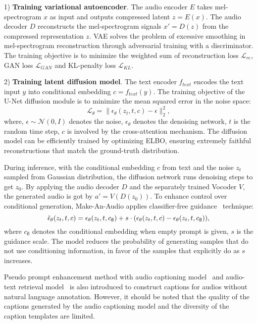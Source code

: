 \documentclass{article}
\begin{document}
1) \textbf{Training variational autoencoder}. The audio encoder $E$ takes mel-spectrogram $x$ as input and outputs compressed latent $z=E(x)$. The audio decoder $D$ reconstructs the mel-spectrogram signals $x'=D(z)$ from the compressed representation $z$. VAE solves the problem of excessive smoothing in mel-spectrogram reconstruction through adversarial training with a discriminator. The training objective is to minimize the weighted sum of reconstruction loss $\mathcal{L}_{re}$, GAN loss $\mathcal{L}_{GAN}$ and KL-penalty loss $\mathcal{L}_{KL}$. 
  
2) \textbf{Training latent diffusion model}. The text encoder $f_{text}$ encodes the text input $y$ into conditional embedding $c=f_{text}(y)$.  The training objective of the U-Net diffusion module is to minimize the mean squared error in the noise space:
\begin{equation}
    \label{score_loss}
    \mathcal{L}_{\theta} = \| \epsilon_\theta(z_t, t, c)-\epsilon\|_2^2,
\end{equation}
where, $\epsilon \sim \mathcal{N}(0,I)$ denotes the noise, $\epsilon_\theta$ denotes the denoising network, $t$ is the random time step, $c$ is involved by the cross-attention mechanism. The diffusion model can be efficiently trained by optimizing ELBO, ensuring extremely faithful reconstructions that match the ground-truth distribution. 

During inference, with the conditional embedding $c$ from text and the noise $z_t$ sampled from Gaussian distribution, the diffusion network runs denoising steps to get $z_0$. By applying the audio decoder $D$ and the separately trained Vocoder $V$, the generated audio is got by $a'=V(D(z_0))$. To enhance control over conditional generation, Make-An-Audio applies classifier-free guidance~\cite{ho2021classifier} technique:
\begin{equation}
\small
    \label{guidance}
    \tilde{\epsilon}_\theta(z_t, t, c) = \epsilon_\theta(z_t, t, c_{\emptyset}) + s \cdot (\epsilon_\theta(z_t, t, c) - \epsilon_\theta(z_t, t, c_{\emptyset})),
\end{equation}
where $c_{\emptyset}$ denotes the conditional embedding when empty prompt is given, $s$ is the guidance scale. The model reduces the probability of generating samples that do not use conditioning information, in favor of the samples that explicitly do as $s$ increases. 

Pseudo prompt enhancement method with audio captioning model~\cite{xu2020crnn} and audio-text retrieval model~\cite{koepke2022audio} is also introduced to construct captions for audios without natural language annotation. However, it should be noted that the quality of the captions generated by the audio captioning model and the diversity of the caption templates are limited.
\end{document}
